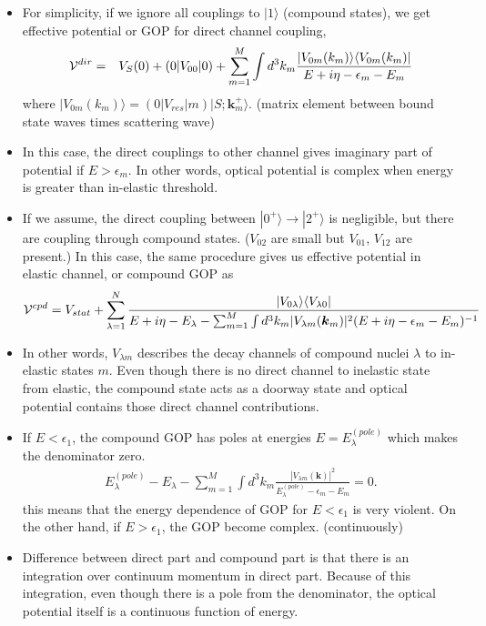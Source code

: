 \documentclass[11pt]{book}
\def\bm{\boldsymbol}
\def\vk{{\bm k}}
\def\la{\langle}
\def\ra{\rangle}
\newcommand{\bea}{\begin{eqnarray}}
\newcommand{\eea}{\end{eqnarray}}
\begin{document}
\begin{itemize} 
\item For simplicity, if we ignore all couplings to $|1\ra$ (compound states),
we get effective potential or GOP for direct channel coupling,
\bea 
{\cal V}^{dir}&=& V_S(0)+(0|V_{00}|0)+\sum_{m=1}^M\int d^3 k_m 
    \frac{|V_{0m}(k_m)\ra\la V_{0m}(k_m)|}{E+i\eta-\epsilon_m-E_m}
\eea 
where $|V_{0m}(k_m)\ra=(0|V_{res}|m)|S;\vk_m^+\ra$. (matrix element between bound state waves times scattering wave)

\item In this case, the direct couplings to other channel gives imaginary part of potential
 if $E> \epsilon_m$. In other words, optical potential is complex when energy is greater than in-elastic threshold.  

\item If we assume, the direct coupling between $|0^{+}\ra \to |2^+\ra$ is negligible, but 
      there are coupling through compound states. 
      ($V_{02}$ are small but $V_{01}$, $V_{12}$ are present.)
      In this case, the same procedure gives us effective potential in elastic channel,
      or compound GOP as
      \bea 
      {\cal V}^{cpd} = V_{stat}+\sum_{\lambda=1}^N \frac{|V_{0\lambda}\ra\la V_{\lambda 0}|}
                        {E+i\eta-E_\lambda-\sum_{m=1}^M\int d^3 k_m |V_{\lambda m}(\vk_m)|^2
                        	(E+i\eta-\epsilon_m-E_m)^{-1}}    
      \eea
\item In other words, $V_{\lambda m}$ describes 
      the decay channels of compound nuclei $\lambda$ to in-elastic states $m$. 
      Even though there is no direct channel to inelastic state from elastic,
      the compound state acts as a doorway state and optical potential 
      contains those direct channel contributions. 
      
\item If $E<\epsilon_1$, the compound GOP has poles at energies $E=E_\lambda^{(pole)}$
      which makes the denominator zero.
      \bea 
      E_\lambda^{(pole)}-E_\lambda-\sum_{m=1}^M\int d^3 k_m \frac{|V_{\lambda m}(\vk)|^2}{E_\lambda^{(pole)}-\epsilon_m-E_m }=0.
      \eea       
      this means that the energy dependence of GOP for $E<\epsilon_1$ is very violent. 
      On the other hand, if $E>\epsilon_1$, the GOP become complex. (continuously)         

\item Difference between direct part and compound part is that there is an integration over 
      continuum momentum in direct part. Because of this integration, even though 
      there is a pole from the denominator, the optical potential itself is a continuous 
      function of energy. 


\end{itemize}
\end{document}
